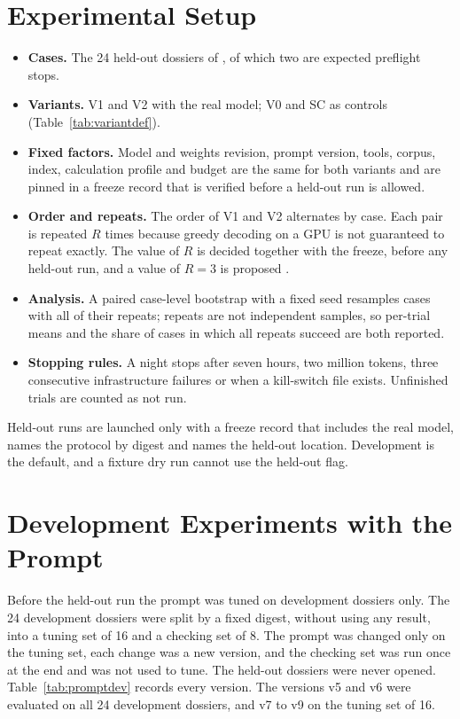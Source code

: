 \section{Experimental Setup}
\label{sec:expsetup}
\begin{itemize}[itemsep=2pt]
\item \textbf{Cases.} The 24 held-out dossiers of , of which two are expected preflight stops.
\item \textbf{Variants.} V1 and V2 with the real model; V0 and SC as controls (Table~\ref{tab:variantdef}).
\item \textbf{Fixed factors.} Model and weights revision, prompt version, tools, corpus, index, calculation
      profile and budget are the same for both variants and are pinned in a freeze record that is verified
      before a held-out run is allowed.
\item \textbf{Order and repeats.} The order of V1 and V2 alternates by case. Each pair is repeated $R$ times
      because greedy decoding on a GPU is not guaranteed to repeat exactly. The value of $R$ is decided together
      with the freeze, before any held-out run, and a value of $R=3$ is proposed .
\item \textbf{Analysis.} A paired case-level bootstrap with a fixed seed resamples cases with all of their
      repeats; repeats are not independent samples, so per-trial means and the share of cases in which all repeats
      succeed are both reported.
\item \textbf{Stopping rules.} A night stops after seven hours, two million tokens, three consecutive
      infrastructure failures or when a kill-switch file exists. Unfinished trials are counted as not run.
\end{itemize}
Held-out runs are launched only with a freeze record that includes the real model, names the protocol by
digest and names the held-out location. Development is the default, and a fixture dry run cannot use the
held-out flag.

\section{Development Experiments with the Prompt}
\label{sec:promptdev}
Before the held-out run the prompt was tuned on development dossiers only. The 24 development dossiers were split
by a fixed digest, without using any result, into a tuning set of 16 and a checking set of 8. The prompt was
changed only on the tuning set, each change was a new version, and the checking set was run once at the end and was
not used to tune. The held-out dossiers were never opened. Table~\ref{tab:promptdev} records every version. The
versions v5 and v6 were evaluated on all 24 development dossiers, and v7 to v9 on the tuning set of 16.

